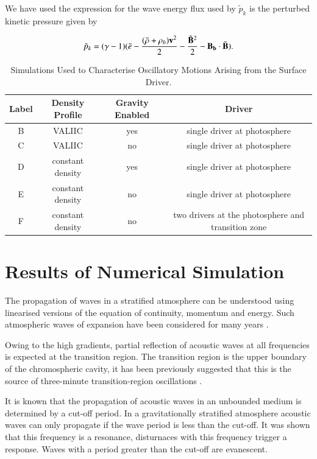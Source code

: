 \documentclass[authoryear,final,1p]{elsarticle}
\begin{document}
We have used the expression for the wave energy flux used by 
 $\tilde{p}_{k}$ is the perturbed kinetic pressure given by \citet{Bogdan2003}

\begin{equation}\label{eqperturbpk}
\tilde{p}_{k}=(\gamma - 1)( \tilde{e}-{{(\tilde{\rho} +\rho_{b})\bf v }^{2}\over{2}}-  {{\tilde{\bf{B}}}^{2}\over{2}}-{\bf{B}_{b}} \cdot  {\tilde{\bf{B}}}).
\end{equation}




\begin{table}
\centering
\begin{tabular}{cccc}
\hline
Label   &  Density Profile & Gravity Enabled & Driver \\
\hline
B &  VALIIC & yes & single driver at photosphere \\
\hline
C & VALIIC & no & single driver at photosphere \\
\hline
D & constant density & yes & single driver at photosphere \\
\hline
E & constant density & no & single driver at photosphere \\
\hline
F & constant density & no & two drivers at the photosphere and transition zone\\
\hline
\end{tabular} 
\caption{Simulations Used to Characterise Oscillatory Motions Arising from the Surface Driver.}
\end{table}






\section{Results of Numerical Simulation}

The propagation of waves in a stratified atmosphere can be understood using linearised versions of the equation of continuity, momentum and energy. Such atmospheric waves of expansion have been considered for many years \citet{Lamb1932}.

Owing to the high gradients, partial reflection of acoustic waves at all frequencies is expected at the transition region. The transition region is the upper boundary of the chromospheric cavity, it has been previously suggested that this is the source of three-minute transition-region oscillations \citet{Leibacher1971}.

It is known that the propagation of acoustic waves in an unbounded medium is determined by a cut-off period. In a gravitationally stratified atmosphere acoustic waves can only propagate if the wave period is less than the cut-off. It was shown that this frequency is a resonance, disturnaces with this frequency trigger a response. Waves with a period greater than the cut-off are evanescent.
\end{document}
